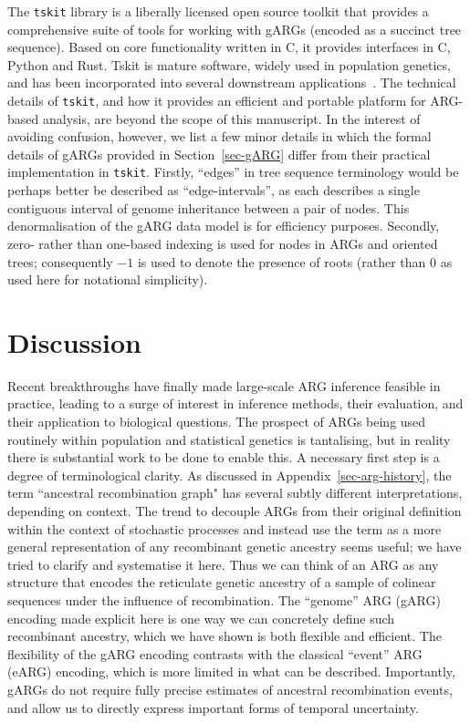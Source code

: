 \documentclass{article}
\begin{document}
The \texttt{tskit} library is a liberally
licensed open source toolkit that provides a comprehensive suite
of tools for working with gARGs (encoded as a succinct tree sequence).
Based on core functionality written
in C, it provides interfaces in C, Python and Rust.
Tskit is mature software, widely used in population genetics, and
has been incorporated into several downstream
applications~\citep[e.g.,][]{haller2019slim,speidel2019method,
adrion2020community,
terasaki2021geonomics,
baumdicker2021efficient,
fan2022genealogical,
guo2022recombination,
korfmann2022weak,
mahmoudi2022bayesian,
petr2022slendr,
rasmussen2022espalier,
zhang2023biobank,
nowbandegani2023extremely,
ignatieva2023distribution,
fan2023likelihood}.
The technical details of \texttt{tskit}, and how it provides an
efficient and portable platform for ARG-based analysis, are beyond
the scope of this manuscript.
In the interest of avoiding confusion, however, we list a
few minor details in which the formal details of gARGs
provided in Section~\ref{sec-gARG} differ from their practical implementation in
\texttt{tskit}.
Firstly, ``edges'' in tree sequence terminology would be perhaps better be
described as ``edge-intervals'', as each describes a single contiguous
interval of genome inheritance between a pair of nodes.
This denormalisation of the gARG data model is for efficiency purposes.
Secondly, zero- rather than one-based indexing is used for
nodes in ARGs and oriented trees; consequently  $-1$ is used to denote the presence of
roots (rather than $0$ as used here for notational simplicity).

\section{Discussion}
\label{sec-discussion}
Recent breakthroughs have finally made large-scale ARG inference
feasible in practice, leading to a surge of interest
in inference methods, their evaluation, and their application to biological questions.
The prospect of ARGs being used routinely within population
and statistical genetics is tantalising,
but in reality there is substantial work to be done to
enable this.
A necessary first step is a degree of terminological clarity.
As discussed in Appendix~\ref{sec-arg-history}, the term
``ancestral recombination graph" has several
subtly different interpretations, depending on context.
The trend to decouple ARGs from their original definition
within the context of stochastic
processes and instead use the term as a more general representation of any
recombinant genetic ancestry seems useful; we have
tried to clarify and systematise it here. Thus
we can think of an ARG as any structure that encodes the
reticulate genetic ancestry of a sample of colinear sequences under
the influence of recombination. The ``genome'' ARG (gARG) encoding
made explicit here is one way we can concretely
define such recombinant ancestry, which we have shown is both
flexible and efficient.
The flexibility of the gARG encoding contrasts with the classical
``event'' ARG (eARG) encoding, which is more limited in what can be described.
Importantly, gARGs do not require fully precise estimates of
ancestral recombination events,
and allow us to directly express important forms of temporal uncertainty.
\end{document}
